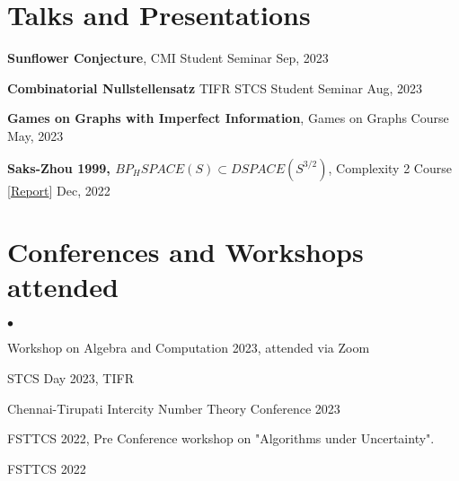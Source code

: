 \documentclass[margin,line, 10pt]{res}
\newenvironment{list2}{
  \begin{list}{$\bullet$}{%
      \setlength{\itemsep}{0in}
      \setlength{\parsep}{0in} \setlength{\parskip}{0in}
      \setlength{\topsep}{0in} \setlength{\partopsep}{0in} 
      \setlength{\leftmargin}{0.2in}}}{\end{list}}
\begin{document}
\begin{resume}
\section{\sc Talks and Presentations}



{\bf Sunflower Conjecture}, CMI Student Seminar \hfill Sep, 2023

\vspace*{-2.5mm}
{\bf Combinatorial Nullstellensatz} TIFR STCS Student Seminar \hfill Aug, 2023

\vspace*{-2.5mm}
{\bf Games on Graphs with Imperfect Information}, Games on Graphs Course \hfill May, 2023

\vspace*{-2.5mm}
{\bf Saks-Zhou 1999, $BP_HSPACE(S)\subset DSPACE(S^{3/2})$}, Complexity 2 Course \hspace{0.5em} [\href{https://www.dropbox.com/scl/fi/d3o6bhib7i7ifok6b8t79/Saks-and-Zhou-1999-Report-Aryan-Agarwala-and-Rohan-Goyal.pdf?rlkey=1xirwrhdz8541vuiq9l189apk&dl=0}{Report}] \hfill Dec, 2022 

\section{\sc Conferences and Workshops attended}

\begin{list2}
    \item Workshop on Algebra and Computation 2023, attended via Zoom
    \item STCS Day 2023, TIFR 
    \item Chennai-Tirupati Intercity Number Theory Conference 2023
    \item FSTTCS 2022, Pre Conference workshop on "Algorithms under Uncertainty".
    \item FSTTCS 2022
\end{list2}


\end{resume}
\end{document}
